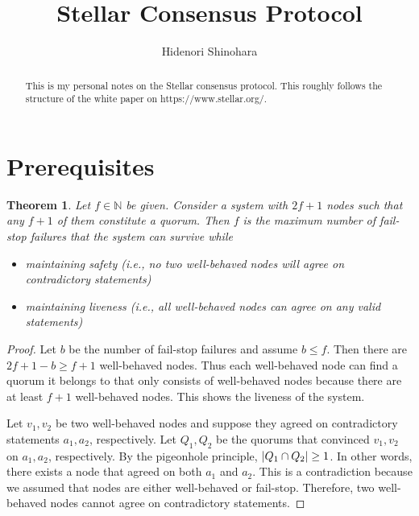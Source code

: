 \documentclass[12pt, psamsfonts]{amsart}
\newtheorem{thm}{Theorem}[section]
\theoremstyle{definition}
\theoremstyle{remark}
\numberwithin{equation}{section}
\begin{document}
\title{Stellar Consensus Protocol}
\author{Hidenori Shinohara}

\begin{abstract}
    This is my personal notes on the Stellar consensus protocol.
    This roughly follows the structure of the white paper on https://www.stellar.org/.
\end{abstract}

\maketitle

\tableofcontents

\section{Prerequisites}

\begin{thm}
    Let $f \in \mathbb{N}$ be given.
    Consider a system with $2f + 1$ nodes such that any $f + 1$ of them constitute a quorum.
    Then $f$ is the maximum number of fail-stop failures that the system can survive while
    \begin{itemize}
        \item
            maintaining safety (i.e., no two well-behaved nodes will agree on contradictory statements)
        \item
            maintaining liveness (i.e., all well-behaved nodes can agree on any valid statements)
    \end{itemize}
\end{thm}

\begin{proof}
    Let $b$ be the number of fail-stop failures and assume $b \leq f$.
    Then there are $2f + 1 - b \geq f + 1$ well-behaved nodes.
    Thus each well-behaved node can find a quorum it belongs to that only consists of well-behaved nodes because there are at least $f + 1$ well-behaved nodes.
    This shows the liveness of the system.

    Let $v_1, v_2$ be two well-behaved nodes and suppose they agreed on contradictory statements $a_1, a_2$, respectively.
    Let $Q_1, Q_2$ be the quorums that convinced $v_1, v_2$ on $a_1, a_2$, respectively.
    By the pigeonhole principle, $\abs{Q_1 \cap Q_2} \geq 1$.
    In other words, there exists a node that agreed on both $a_1$ and $a_2$.
    This is a contradiction because we assumed that nodes are either well-behaved or fail-stop.
    Therefore, two well-behaved nodes cannot agree on contradictory statements.
\end{proof}
\end{document}
